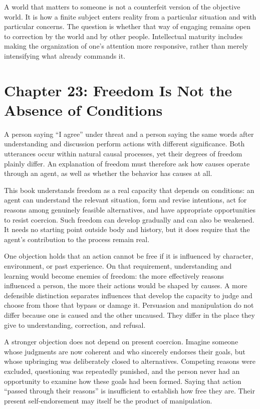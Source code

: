 \documentclass[
  english,
  11pt,
  oneside]{book}
\begin{document}
\begingroup{}

A world that matters to someone is not a counterfeit version of the objective world. It is how a finite subject enters reality from a particular situation and with particular concerns. The question is whether that way of engaging remains open to correction by the world and by other people. Intellectual maturity includes making the organization of one's attention more responsive, rather than merely intensifying what already commands it.

\par\endgroup

\chapter{Chapter 23: Freedom Is Not the Absence of Conditions}\label{ph-ch-23}

A person saying ``I agree'' under threat and a person saying the same words after understanding and discussion perform actions with different significance. Both utterances occur within natural causal processes, yet their degrees of freedom plainly differ. An explanation of freedom must therefore ask how causes operate through an agent, as well as whether the behavior has causes at all.

This book understands freedom as a real capacity that depends on conditions: an agent can understand the relevant situation, form and revise intentions, act for reasons among genuinely feasible alternatives, and have appropriate opportunities to resist coercion. Such freedom can develop gradually and can also be weakened. It needs no starting point outside body and history, but it does require that the agent's contribution to the process remain real.

One objection holds that an action cannot be free if it is influenced by character, environment, or past experience. On that requirement, understanding and learning would become enemies of freedom: the more effectively reasons influenced a person, the more their actions would be shaped by causes. A more defensible distinction separates influences that develop the capacity to judge and choose from those that bypass or damage it. Persuasion and manipulation do not differ because one is caused and the other uncaused. They differ in the place they give to understanding, correction, and refusal.

A stronger objection does not depend on present coercion. Imagine someone whose judgments are now coherent and who sincerely endorses their goals, but whose upbringing was deliberately closed to alternatives. Competing reasons were excluded, questioning was repeatedly punished, and the person never had an opportunity to examine how these goals had been formed. Saying that action ``passed through their reasons'' is insufficient to establish how free they are. Their present self-endorsement may itself be the product of manipulation.
\end{document}
